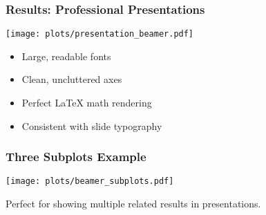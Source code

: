 \documentclass{beamer}
\begin{document}
\begin{frame}
\frametitle{Results: Professional Presentations}

\begin{center}
\texttt{[image: plots/presentation\_beamer.pdf]}
\end{center}

\begin{itemize}
    \item Large, readable fonts
    \item Clean, uncluttered axes  
    \item Perfect LaTeX math rendering
    \item Consistent with slide typography
\end{itemize}

\end{frame}

\begin{frame}
\frametitle{Three Subplots Example}

\begin{center}
\texttt{[image: plots/beamer\_subplots.pdf]}
\end{center}

Perfect for showing multiple related results in presentations.

\end{frame}
\end{document}
